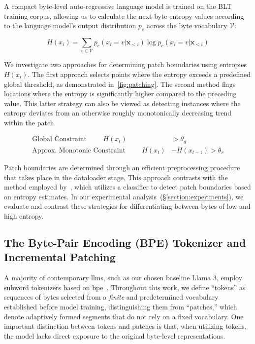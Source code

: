A compact byte-level auto-regressive language model is trained on the {\textsc BLT} training corpus, allowing us to calculate the next-byte entropy values according to the language model's output distribution $p_{e}$ across the byte vocabulary $\mathcal{V}$:

\begin{equation}
H(x_i) = \sum_{v \in \mathcal{V}} p_{e}(x_i=v|\pmb{x}_{<i}) \log p_{e}(x_i=v|\pmb{x}_{<i})
\end{equation}

We investigate two approaches for determining patch boundaries using entropies $H(x_i)$. The first approach selects points where the entropy exceeds a predefined global threshold, as demonstrated in~\autoref{fig:patching}. The second method flags locations where the entropy is significantly higher compared to the preceding value. This latter strategy can also be viewed as detecting instances where the entropy deviates from an otherwise roughly monotonically decreasing trend within the patch.

\begin{align*}
    \text{Global Constraint}\hspace{1cm}H(x_t)& > \theta_g\\
    \text{Approx. Monotonic Constraint}\hspace{1cm}H(x_t)& - H(x_{t-1}) > \theta_r
\end{align*}

Patch boundaries are determined through an efficient preprocessing procedure that takes place in the dataloader stage. This approach contrasts with the method employed by~\citet{nawrot-etal-2023-efficient}, which utilizes a classifier to detect patch boundaries based on entropy estimates. In our experimental analysis~(\S\ref{section:experiments}), we evaluate and contrast these strategies for differentiating between bytes of low and high entropy.

\subsection{The Byte-Pair Encoding (BPE) Tokenizer and Incremental Patching}
\label{section:incremental-patching}
\label{section:bpe-patch}

A majority of contemporary llms, such as our chosen baseline Llama 3, employ subword tokenizers based on bpe~\citep{gage1994new, sennrich-etal-2016-neural}. Throughout this work, we define ``tokens'' as sequences of bytes selected from a \textit{finite} and predetermined vocabulary established before model training, distinguishing them from ``patches,'' which denote adaptively formed segments that do not rely on a fixed vocabulary. One important distinction between tokens and patches is that, when utilizing tokens, the model lacks direct exposure to the original byte-level representations.

